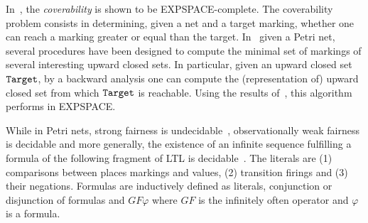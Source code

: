 In~\cite{rackoff78}, the \emph{coverability} is shown 
to be EXPSPACE-complete. The coverability problem
consists in determining, given a net and a target marking, whether one can reach a marking
greater or equal than the target.  
In~\cite{VJ84} given a Petri net, several procedures have been designed to compute the minimal
set of markings of several interesting upward closed sets. In particular,
given an upward closed set $\mathtt{Target}$, by a backward analysis one can compute
the (representation of) upward closed set from which $\mathtt{Target}$ is reachable.
Using the results of~\cite{rackoff78}, this algorithm performs in EXPSPACE.

While in Petri nets, strong fairness is undecidable~\cite{carst87}, 
observationally weak fairness is decidable and more generally, 
the existence of an infinite sequence fulfilling a formula of the
following fragment of LTL is decidable~\cite{Jancar90}. The literals are (1) comparisons
between places markings and values, (2) transition firings and (3)  their negations. Formulas
are inductively defined as literals, conjunction or disjunction of formulas and $GF \varphi$
where $GF$ is the infinitely often operator and $\varphi$ is a formula. 


